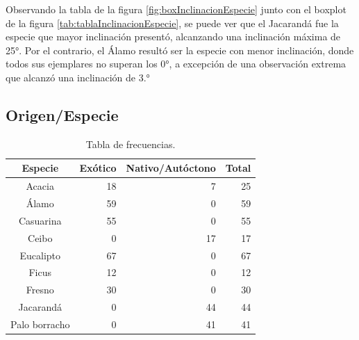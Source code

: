 \documentclass[11pt]{article}
\begin{document}
\begin{justify}
  Observando la tabla de la figura \ref{fig:boxInclinacionEspecie} junto con el
  boxplot de la figura \ref{tab:tablaInclinacionEspecie}, se puede ver que el
  Jacarandá fue la especie que mayor inclinación presentó, alcanzando una
  inclinación máxima de 25°. Por el contrario, el Álamo resultó ser la especie
  con menor inclinación, donde todos sus ejemplares no superan los 0°,
  a excepción de una observación extrema que alcanzó una inclinación de 3.°
\end{justify}


\newpage
\subsection{Origen/Especie}

\begin{table}[h!]
  \begin{center}
    \begin{tabular}{| c | r | r | r |}
      \hline
      \textbf{Especie} & \textbf{Exótico} & \textbf{Nativo/Autóctono} &
      \textbf{Total} \\ \hline
      Acacia & 18 & 7 & 25 \\ \hline
      Álamo & 59 & 0 & 59 \\ \hline
      Casuarina & 55 & 0 & 55 \\ \hline
      Ceibo & 0 & 17 & 17 \\ \hline
      Eucalipto & 67 & 0 & 67 \\ \hline
      Ficus & 12 & 0 & 12 \\ \hline
      Fresno & 30 & 0 & 30 \\ \hline
      Jacarandá & 0 & 44 & 44 \\ \hline
      Palo borracho & 0 & 41 & 41 \\ \hline
    \end{tabular}
    \caption{Tabla de frecuencias.}
    \label{tab:tablaOrigenEspecie}
  \end{center}
\end{table}
\end{document}
